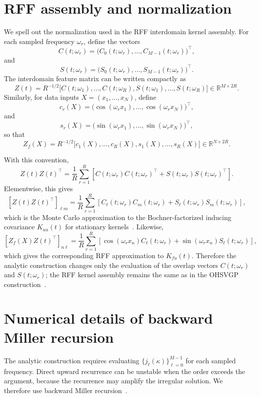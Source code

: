 \documentclass{article}
\theoremstyle{plain}
\theoremstyle{definition}
\theoremstyle{remark}
\begin{document}
\section{RFF assembly and normalization}
\label{app:rff-normalization}

We spell out the normalization used in the RFF interdomain kernel assembly. For each sampled frequency \(\omega_r\), define the vectors
\[
C(t;\omega_r)
=
\bigl(C_0(t;\omega_r),\ldots,C_{M-1}(t;\omega_r)\bigr)^\top,
\]
and
\[
S(t;\omega_r)
=
\bigl(S_0(t;\omega_r),\ldots,S_{M-1}(t;\omega_r)\bigr)^\top.
\]
The interdomain feature matrix can be written compactly as
\[
Z(t)
=
R^{-1/2}
\bigl[
C(t;\omega_1),\ldots,C(t;\omega_R),
S(t;\omega_1),\ldots,S(t;\omega_R)
\bigr]
\in\mathbb{R}^{M\times 2R}.
\]
Similarly, for data inputs \(X=(x_1,\ldots,x_N)\), define
\[
c_r(X)
=
\bigl(\cos(\omega_r x_1),\ldots,\cos(\omega_r x_N)\bigr)^\top,
\]
and
\[
s_r(X)
=
\bigl(\sin(\omega_r x_1),\ldots,\sin(\omega_r x_N)\bigr)^\top,
\]
so that
\[
Z_f(X)
=
R^{-1/2}
\bigl[
c_1(X),\ldots,c_R(X),
s_1(X),\ldots,s_R(X)
\bigr]
\in\mathbb{R}^{N\times 2R}.
\]

With this convention,
\[
Z(t)Z(t)^\top
=
\frac{1}{R}\sum_{r=1}^{R}
\left[
C(t;\omega_r)C(t;\omega_r)^\top
+
S(t;\omega_r)S(t;\omega_r)^\top
\right].
\]
Elementwise, this gives
\[
[Z(t)Z(t)^\top]_{\ell m}
=
\frac{1}{R}\sum_{r=1}^{R}
\left[
C_\ell(t;\omega_r)C_m(t;\omega_r)
+
S_\ell(t;\omega_r)S_m(t;\omega_r)
\right],
\]
which is the Monte Carlo approximation to the Bochner-factorized inducing covariance \(K_{uu}(t)\) for stationary kernels~\citep{Rudin1994,Rahimi2007}. Likewise,
\[
[Z_f(X)Z(t)^\top]_{n\ell}
=
\frac{1}{R}\sum_{r=1}^{R}
\left[
\cos(\omega_r x_n)C_\ell(t;\omega_r)
+
\sin(\omega_r x_n)S_\ell(t;\omega_r)
\right],
\]
which gives the corresponding RFF approximation to \(K_{fu}(t)\). Therefore the analytic construction changes only the evaluation of the overlap vectors \(C(t;\omega_r)\) and \(S(t;\omega_r)\); the RFF kernel assembly remains the same as in the OHSVGP construction~\citep{Chen2025}.

\section{Numerical details of backward Miller recursion}
\label{app:miller}

The analytic construction requires evaluating
\(\{j_\ell(\kappa)\}_{\ell=0}^{M-1}\) for each sampled frequency. Direct upward recurrence can be unstable when the order exceeds the argument, because the recurrence may amplify the irregular solution. We therefore use backward Miller recursion~\citep{Gautschi1967,DLMF}.
\end{document}
